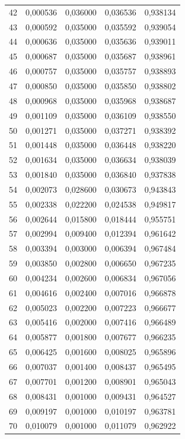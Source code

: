 \begin{small}
\begin{longtable}{rrrrr}
42 & 0,000536 & 0,036000 & 0,036536 & 0,938134 \\
43 & 0,000592 & 0,035000 & 0,035592 & 0,939054 \\
44 & 0,000636 & 0,035000 & 0,035636 & 0,939011 \\
45 & 0,000687 & 0,035000 & 0,035687 & 0,938961 \\
46 & 0,000757 & 0,035000 & 0,035757 & 0,938893 \\
47 & 0,000850 & 0,035000 & 0,035850 & 0,938802 \\
48 & 0,000968 & 0,035000 & 0,035968 & 0,938687 \\
49 & 0,001109 & 0,035000 & 0,036109 & 0,938550 \\
50 & 0,001271 & 0,035000 & 0,037271 & 0,938392 \\
51 & 0,001448 & 0,035000 & 0,036448 & 0,938220 \\
52 & 0,001634 & 0,035000 & 0,036634 & 0,938039 \\
53 & 0,001840 & 0,035000 & 0,036840 & 0,937838 \\
54 & 0,002073 & 0,028600 & 0,030673 & 0,943843 \\
55 & 0,002338 & 0,022200 & 0,024538 & 0,949817 \\
56 & 0,002644 & 0,015800 & 0,018444 & 0,955751 \\
57 & 0,002994 & 0,009400 & 0,012394 & 0,961642 \\
58 & 0,003394 & 0,003000 & 0,006394 & 0,967484 \\
59 & 0,003850 & 0,002800 & 0,006650 & 0,967235 \\
60 & 0,004234 & 0,002600 & 0,006834 & 0,967056 \\
61 & 0,004616 & 0,002400 & 0,007016 & 0,966878 \\
62 & 0,005023 & 0,002200 & 0,007223 & 0,966677 \\
63 & 0,005416 & 0,002000 & 0,007416 & 0,966489 \\
64 & 0,005877 & 0,001800 & 0,007677 & 0,966235 \\
65 & 0,006425 & 0,001600 & 0,008025 & 0,965896 \\
66 & 0,007037 & 0,001400 & 0,008437 & 0,965495 \\
67 & 0,007701 & 0,001200 & 0,008901 & 0,965043 \\
68 & 0,008431 & 0,001000 & 0,009431 & 0,964527 \\
69 & 0,009197 & 0,001000 & 0,010197 & 0,963781 \\
70 & 0,010079 & 0,001000 & 0,011079 & 0,962922 \\

\end{longtable}
\end{small}

